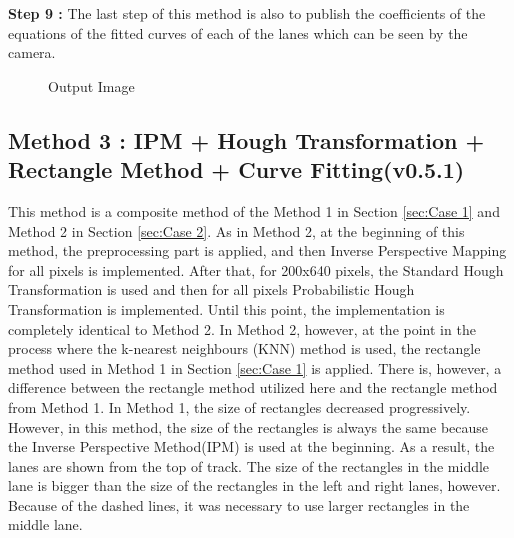 \textbf{Step 9 : }The last step of this method is also to publish the coefficients of the equations of the fitted curves of each of the lanes which can be seen by the camera.


\begin{figure}[H]
  \centering
  \caption{Output Image}
\end{figure} 


\subsection{Method 3 : IPM + Hough Transformation + Rectangle Method + Curve Fitting(v0.5.1)}\label{sec:Case 3}

This method is a composite method of the Method 1 in Section \ref{sec:Case 1} and Method 2 in Section \ref{sec:Case 2}. As in Method 2, at the beginning of this method, the preprocessing part is applied, and then Inverse Perspective Mapping for all pixels is implemented. After that, for 200x640 pixels, the Standard Hough Transformation is used and then for all pixels Probabilistic Hough Transformation is implemented. Until this point, the implementation is completely identical to Method 2. In Method 2, however, at the point in the process where the k-nearest neighbours (KNN) method is used, the rectangle method used in Method 1 in Section \ref{sec:Case 1} is applied. There is, however, a difference between the rectangle method utilized here and the rectangle method from Method 1. In Method 1, the size of rectangles decreased progressively. However, in this method, the size of the rectangles is always the same because the Inverse Perspective Method(IPM) is used at the beginning. As a result, the lanes are shown from the top of track. The size of the rectangles in the middle lane is bigger than the size of the rectangles in the left and right lanes, however. Because of the dashed lines, it was necessary to use larger rectangles in the middle lane.

